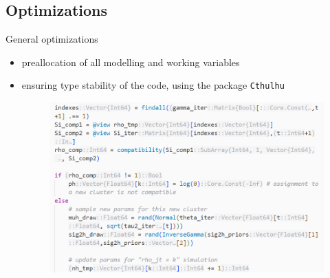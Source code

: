 \documentclass[
	11pt, %
 xcolor={dvipsnames,svgnames}
]{beamer}
\newcommand{\mjline}[1]{\texttt{#1}}
\begin{document}
\subsection{Optimizations}

\begin{frame}{General optimizations}

\begin{itemize}
    \item preallocation of all modelling and working variables
    \item ensuring type stability of the code, using the package \mjline{Cthulhu}
\begin{figure}
        \centering
        \includegraphics[clip,trim=0px 60px 0px 0px, width=0.94\linewidth]{imgs/ctulhu.png}
        \label{fig:enter-label}
    \end{figure}
\end{itemize}
\end{frame}
\end{document}
